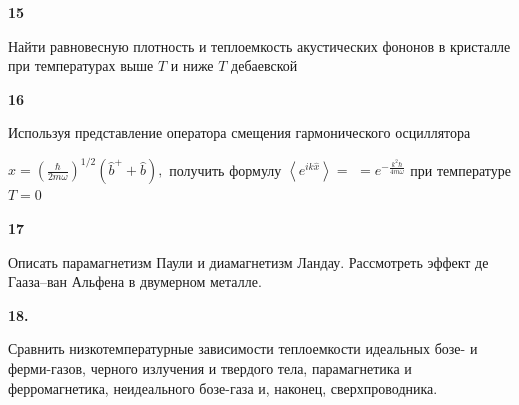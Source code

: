 \documentclass[a4paper,12pt]{article} %
\begin{document}
\begin{ttask}\textbf{15}

Найти равновесную плотность и теплоемкость акустических фононов в кристалле при температурах выше $ T $  и ниже $ T $  дебаевской




















\end{ttask}


\begin{ttask}\textbf{16}

Используя представление оператора смещения гармонического осциллятора 

$\hat{x}=\left(\frac{\hbar}{2 m \omega}\right)^{1 / 2}\left(\hat{b}^{+}+\hat{b}\right),$ 
получить формулу $\left\langle e^{i k \hat{x}}\right\rangle=$
$=e^{-\frac{k^{2} \hbar}{4 m \omega}}$ при температуре $T=0$

















\end{ttask}




\begin{ttask} \textbf{17}


Описать парамагнетизм Паули и диамагнетизм Ландау. 
Рассмотреть эффект де Гааза–ван Альфена в двумерном металле. 

















\end{ttask}


\begin{ttask}\textbf{18. }

Сравнить низкотемпературные зависимости теплоемкости идеальных бозе- и ферми-газов, черного излучения и твердого тела, парамагнетика и ферромагнетика, неидеального бозе-газа и, наконец, сверхпроводника. 






















\end{ttask}
\end{document}
